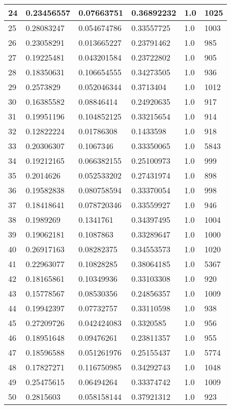 \begin{longtable}{|l|l|l|l|l|l|}
24 & 0.23456557 & 0.07663751 & 0.36892232 & 1.0 & 1025 \\ \hline 
25 & 0.28083247 & 0.054674786 & 0.33557725 & 1.0 & 1003 \\ \hline 
26 & 0.23058291 & 0.013665227 & 0.23791462 & 1.0 & 985 \\ \hline 
27 & 0.19225481 & 0.043201584 & 0.23722802 & 1.0 & 905 \\ \hline 
28 & 0.18350631 & 0.106654555 & 0.34273505 & 1.0 & 936 \\ \hline 
29 & 0.2573829 & 0.052046344 & 0.3713404 & 1.0 & 1012 \\ \hline 
30 & 0.16385582 & 0.08846414 & 0.24920635 & 1.0 & 917 \\ \hline 
31 & 0.19951196 & 0.104852125 & 0.33215654 & 1.0 & 914 \\ \hline 
32 & 0.12822224 & 0.01786308 & 0.1433598 & 1.0 & 918 \\ \hline 
33 & 0.20306307 & 0.1067346 & 0.33350065 & 1.0 & 5843 \\ \hline 
34 & 0.19212165 & 0.066382155 & 0.25100973 & 1.0 & 999 \\ \hline 
35 & 0.2014626 & 0.052533202 & 0.27431974 & 1.0 & 898 \\ \hline 
36 & 0.19582838 & 0.080758594 & 0.33370054 & 1.0 & 998 \\ \hline 
37 & 0.18418641 & 0.078720346 & 0.33559927 & 1.0 & 946 \\ \hline 
38 & 0.1989269 & 0.1341761 & 0.34397495 & 1.0 & 1004 \\ \hline 
39 & 0.19062181 & 0.1087863 & 0.33289647 & 1.0 & 1000 \\ \hline 
40 & 0.26917163 & 0.08282375 & 0.34553573 & 1.0 & 1020 \\ \hline 
41 & 0.22963077 & 0.10828285 & 0.38064185 & 1.0 & 5367 \\ \hline 
42 & 0.18165861 & 0.10349936 & 0.33103308 & 1.0 & 920 \\ \hline 
43 & 0.15778567 & 0.08530356 & 0.24856357 & 1.0 & 1009 \\ \hline 
44 & 0.19942397 & 0.07732757 & 0.33110598 & 1.0 & 938 \\ \hline 
45 & 0.27209726 & 0.042424083 & 0.3320585 & 1.0 & 956 \\ \hline 
46 & 0.18951648 & 0.09476261 & 0.23811357 & 1.0 & 955 \\ \hline 
47 & 0.18596588 & 0.051261976 & 0.25155437 & 1.0 & 5774 \\ \hline 
48 & 0.17827271 & 0.116750985 & 0.34292743 & 1.0 & 1048 \\ \hline 
49 & 0.25475615 & 0.06494264 & 0.33374742 & 1.0 & 1009 \\ \hline 
50 & 0.2815603 & 0.058158144 & 0.37921312 & 1.0 & 923 \\ \hline 
\end{longtable}